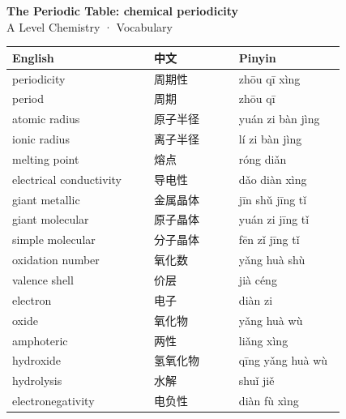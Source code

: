 \documentclass[11pt]{article}
\begin{document}
\begin{center}
  {\LARGE\bfseries The Periodic Table: chemical periodicity}\\[0.35em]
  {\large A Level Chemistry · Vocabulary}
\end{center}
\vspace{0.6em}

\begin{longtable}{@{}p{0.40\linewidth}p{0.24\linewidth}p{0.30\linewidth}@{}}
\toprule
\textbf{English} & \textbf{中文} & \textbf{Pinyin} \\
\midrule
\endhead
\bottomrule
\endlastfoot
periodicity & 周期性 & zhōu qī xìng \\
period & 周期 & zhōu qī \\
atomic radius & 原子半径 & yuán zi bàn jìng \\
ionic radius & 离子半径 & lí zi bàn jìng \\
melting point & 熔点 & róng diǎn \\
electrical conductivity & 导电性 & dǎo diàn xìng \\
giant metallic & 金属晶体 & jīn shǔ jīng tǐ \\
giant molecular & 原子晶体 & yuán zi jīng tǐ \\
simple molecular & 分子晶体 & fēn zǐ jīng tǐ \\
oxidation number & 氧化数 & yǎng huà shù \\
valence shell & 价层 & jià céng \\
electron & 电子 & diàn zi \\
oxide & 氧化物 & yǎng huà wù \\
amphoteric & 两性 & liǎng xìng \\
hydroxide & 氢氧化物 & qīng yǎng huà wù \\
hydrolysis & 水解 & shuǐ jiě \\
electronegativity & 电负性 & diàn fù xìng \\
\end{longtable}
\end{document}
